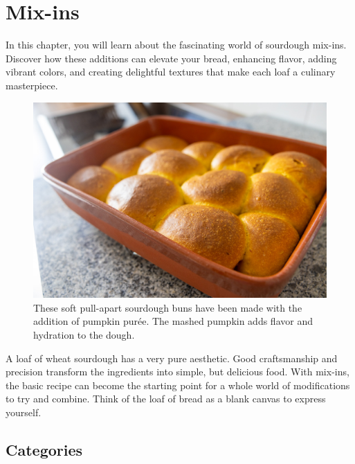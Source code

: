 \chapter{Mix-ins}%
\label{ch:mix-ins}
\begin{quoting}
  In this chapter, you will learn about the fascinating world of sourdough
  mix-ins. Discover how these additions can elevate your bread, enhancing
  flavor, adding vibrant colors, and creating delightful textures that make
  each loaf a culinary masterpiece.
\end{quoting}

\begin{figure}[htb!]
  \includegraphics[width=\textwidth]{pumpkin-sourdough}
  \caption[Pumpkin sourdough softbuns]{These soft pull-apart sourdough
    buns have been made with the addition of pumpkin purée. The mashed pumpkin
    adds flavor and hydration to the dough.}%
\end{figure}

A loaf of wheat sourdough has a very pure aesthetic. Good craftsmanship and
precision transform the ingredients into simple, but delicious food. With
mix-ins, the basic recipe can become the starting point for a whole world of
modifications to try and combine. Think of the loaf of bread as a blank canvas
to express yourself.

\section{Categories}

